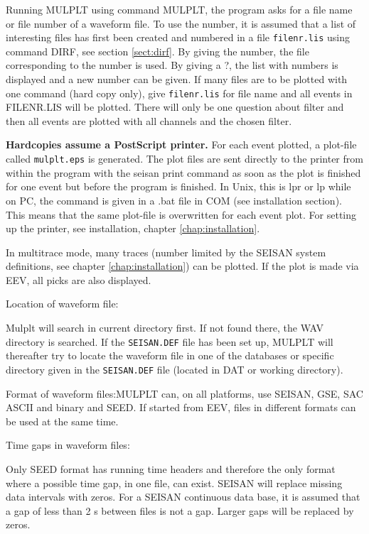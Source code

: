 Running MULPLT using command MULPLT, the program asks for a file name 
or file number of a waveform file. To use the 
number, it is assumed that a list of interesting files has first 
been created and numbered in a file \texttt{filenr.lis} using command 
DIRF, see section \ref{sect:dirf}. By giving the number, the file corresponding 
to the number is used. By giving a ?, the list with numbers is displayed and a new number can be given. If many files are to be plotted with one command (hard copy only), give \texttt{filenr.lis} for file name and all events in FILENR.LIS will be plotted. There will only be one question about filter and then all events are plotted with all channels and the chosen filter. 

\textbf{Hardcopies assume a PostScript printer.} 
For each event plotted, a plot-file called \texttt{mulplt.eps} is generated. The 
plot files are sent directly to the printer from within the program 
with the seisan print command as soon as the plot is finished for 
one event but before the program is finished. In Unix, this is lpr 
or lp while on PC, the command is given in a .bat file in COM (see 
installation section). This means that the same plot-file is overwritten 
for each event plot.  For setting up the printer, see installation, 
chapter \ref{chap:installation}. %

In multitrace mode, many traces (number limited by the SEISAN system 
definitions, see chapter \ref{chap:installation}) %
can be plotted. If the plot is made via EEV, all picks are also displayed. 

Location of waveform file: 

Mulplt will search in current directory first. If not found there, the WAV directory is searched. If the \texttt{SEISAN.DEF} file has been set up, MULPLT will thereafter try to locate the waveform file in one of the databases or specific directory given in the \texttt{SEISAN.DEF} file (located in DAT or working directory).  

Format of waveform files:MULPLT can, on all platforms, use SEISAN, GSE, SAC ASCII and binary and SEED.  If started from EEV, files in different formats can be used at the same time. 

Time gaps in waveform files: 

Only SEED format has running time headers and therefore the only format where a possible time gap, in one file, can exist. SEISAN will replace missing data intervals with zeros. For a SEISAN continuous data base, it is assumed that a gap of less than 2 s between files is not a gap. Larger gaps will be replaced by zeros.

